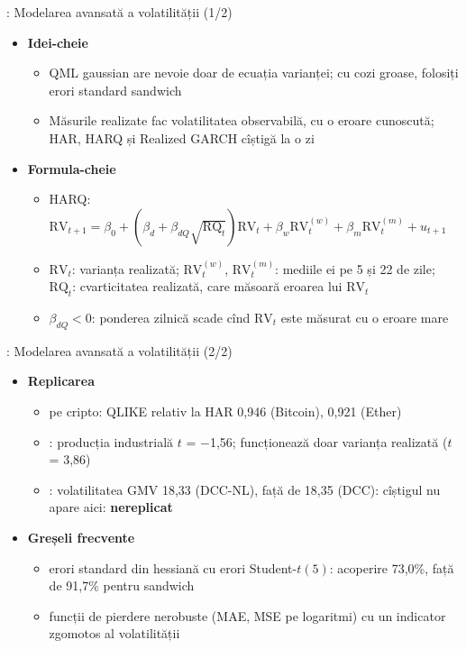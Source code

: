 \begin{frame}{: Modelarea avansată a volatilității (1/2)}
\itemsize{\footnotesize}
\begin{itemize}
    \item \textbf{Idei-cheie}
    \begin{itemize}
        \item QML gaussian are nevoie doar de ecuația varianței; cu cozi groase, folosiți erori standard sandwich
        \item Măsurile realizate fac volatilitatea observabilă, cu o eroare cunoscută; HAR, HARQ și Realized GARCH cîștigă la o zi
    \end{itemize}
    \item \textbf{Formula-cheie}
    \begin{itemize}
        \item HARQ: $\mathrm{RV}_{t+1} = \beta_0 + (\beta_d + \beta_{dQ}\sqrt{\mathrm{RQ}_t})\mathrm{RV}_t + \beta_w\mathrm{RV}^{(w)}_t + \beta_m\mathrm{RV}^{(m)}_t + u_{t+1}$
        \item $\mathrm{RV}_t$: varianța realizată; $\mathrm{RV}^{(w)}_t$, $\mathrm{RV}^{(m)}_t$: mediile ei pe 5 și 22 de zile; $\mathrm{RQ}_t$: cvarticitatea realizată, care măsoară eroarea lui $\mathrm{RV}_t$
        \item $\beta_{dQ} < 0$: ponderea zilnică scade cînd $\mathrm{RV}_t$ este măsurat cu o eroare mare
    \end{itemize}
\end{itemize}
\end{frame}

\begin{frame}{: Modelarea avansată a volatilității (2/2)}
\itemsize{\small}
\begin{itemize}
    \item \textbf{Replicarea}
    \begin{itemize}
        \item {} pe cripto: QLIKE relativ la HAR 0{,}946 (Bitcoin), 0{,}921 (Ether)
        \item {}: producția industrială $t$ = \ensuremath{-}1{,}56; funcționează doar varianța realizată ($t$ = 3{,}86)
        \item {}: volatilitatea GMV 18{,}33 (DCC-NL), față de 18{,}35 (DCC): cîștigul nu apare aici: \textbf{nereplicat}
    \end{itemize}
    \item \textbf{Greșeli frecvente}
    \begin{itemize}
        \item erori standard din hessiană cu erori Student-$t(5)$: acoperire 73{,}0\%, față de 91{,}7\% pentru sandwich
        \item funcții de pierdere nerobuste (MAE, MSE pe logaritmi) cu un indicator zgomotos al volatilității
    \end{itemize}
\end{itemize}
\end{frame}

